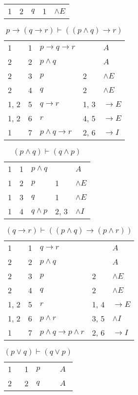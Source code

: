 \documentclass{article}
\begin{document}
\begin{table}[htbp]
\begin{tabular}{lrlll}
{1} & 2 & $q$ & {1} & $∧E$ \\
\end{tabular}
\end{table}\begin{table}[htbp]\caption*{$p → (q → r) ⊢ ((p ∧ q) → r)$}\centering\begin{tabular}{lrlll}
{1} & 1 & $p→q→r$ & {} & $A$ \\
{2} & 2 & $p∧q$ & {} & $A$ \\
{2} & 3 & $p$ & {2} & $∧E$ \\
{2} & 4 & $q$ & {2} & $∧E$ \\
{1, 2} & 5 & $q→r$ & {1, 3} & $→E$ \\
{1, 2} & 6 & $r$ & {4, 5} & $→E$ \\
{1} & 7 & $p∧q→r$ & {2, 6} & $→I$ \\
\end{tabular}
\end{table}\begin{table}[htbp]\caption*{$(p ∧ q) ⊢ (q ∧ p)$}\centering\begin{tabular}{lrlll}
{1} & 1 & $p∧q$ & {} & $A$ \\
{1} & 2 & $p$ & {1} & $∧E$ \\
{1} & 3 & $q$ & {1} & $∧E$ \\
{1} & 4 & $q∧p$ & {2, 3} & $∧I$ \\
\end{tabular}
\end{table}\begin{table}[htbp]\caption*{$(q → r) ⊢ ((p ∧ q) → (p ∧ r))$}\centering\begin{tabular}{lrlll}
{1} & 1 & $q→r$ & {} & $A$ \\
{2} & 2 & $p∧q$ & {} & $A$ \\
{2} & 3 & $p$ & {2} & $∧E$ \\
{2} & 4 & $q$ & {2} & $∧E$ \\
{1, 2} & 5 & $r$ & {1, 4} & $→E$ \\
{1, 2} & 6 & $p∧r$ & {3, 5} & $∧I$ \\
{1} & 7 & $p∧q→p∧r$ & {2, 6} & $→I$ \\
\end{tabular}
\end{table}\begin{table}[htbp]\caption*{$(p∨q) ⊢ (q∨p)$}\centering\begin{tabular}{lrlll}
{1} & 1 & $p$ & {} & $A$ \\
{2} & 2 & $q$ & {} & $A$ \\

\end{tabular}
\end{table}
\end{document}

